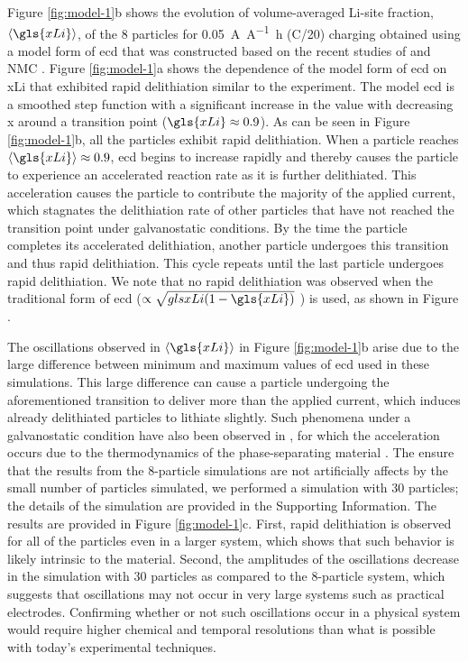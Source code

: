 \documentclass{article}
\begin{document}
Figure \ref{fig:model-1}b shows the evolution of volume-averaged
Li-site fraction, $\left\langle \gls{xLi} \right\rangle$, of the 8
particles for \SI{0.05}{\ampere\per\ampere\hour} (C/20) charging
obtained using a model form of \gls{ecd} that was constructed based on
the recent studies of \nca{} \cite{chueh2021} and NMC \cite{tsai2018,
  mukherjee2017, chiang2020}. Figure \ref{fig:model-1}a shows the
dependence of the model form of \gls{ecd} on \gls{xLi} that exhibited
rapid delithiation similar to the experiment. The model \gls{ecd} is a
smoothed step function with a significant increase in the value with
decreasing x around a transition point ($\gls{xLi}\approx0.9$). As can
be seen in Figure \ref{fig:model-1}b, all the particles exhibit rapid
delithiation. When a particle reaches $\left\langle \gls{xLi}
\right\rangle\approx0.9$, \gls{ecd} begins to increase rapidly and
thereby causes the particle to experience an accelerated reaction rate
as it is further delithiated. This acceleration causes the particle to
contribute the majority of the applied current, which stagnates the
delithiation rate of other particles that have not reached the
transition point under galvanostatic conditions. By the time the
particle completes its accelerated delithiation, another particle
undergoes this transition and thus rapid delithiation. This cycle
repeats until the last particle undergoes rapid delithiation.  We note
that no rapid delithiation was observed when the traditional form of
\gls{ecd} ($\propto\sqrt{gls{xLi}(1-\gls{xLi})}$ \cite{newman1993,
  newman1994, newman1995, newman1996}) is used, as shown in Figure
.

The oscillations observed in $\left\langle \gls{xLi} \right\rangle$ in
Figure \ref{fig:model-1}b arise due to the large difference between
minimum and maximum values of \gls{ecd} used in these
simulations. This large difference can cause a particle undergoing the
aforementioned transition to deliver more than the applied current,
which induces already delithiated particles to lithiate slightly. Such
phenomena under a galvanostatic condition have also been observed in
, for which the acceleration occurs due to the
thermodynamics of the phase-separating material
\cite{thornton2015}. The ensure that the results from the 8-particle simulations
are not artificially affects by the small number of particles
simulated, we performed a simulation with 30 particles; the details of
the simulation are provided in the Supporting Information. The results
are provided in Figure \ref{fig:model-1}c. First, rapid delithiation
is observed for all of the particles even in a larger system, which
shows that such behavior is likely intrinsic to the material. Second,
the amplitudes of the oscillations decrease in the simulation with 30
particles as compared to the 8-particle system, which suggests that
oscillations may not occur in very large systems such as practical
electrodes.  Confirming whether or not such oscillations occur in a
physical system would require higher chemical and temporal resolutions
than what is possible with today's experimental techniques.
\end{document}
